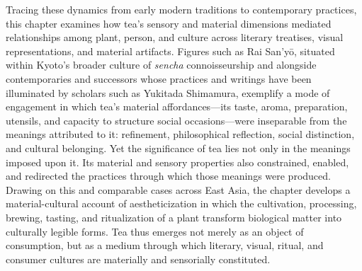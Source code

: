 \documentclass[numbers]{IntechOpen-Book}
\begin{document}
Tracing these dynamics from early modern traditions to contemporary practices, this chapter examines how tea's sensory and material dimensions mediated relationships among plant, person, and culture across literary treatises, visual representations, and material artifacts. Figures such as Rai San'yō, situated within Kyoto's broader culture of \textit{sencha} connoisseurship and alongside contemporaries and successors whose practices and writings have been illuminated by scholars such as Yukitada Shimamura, exemplify a mode of engagement in which tea's material affordances---its taste, aroma, preparation, utensils, and capacity to structure social occasions---were inseparable from the meanings attributed to it: refinement, philosophical reflection, social distinction, and cultural belonging. Yet the significance of tea lies not only in the meanings imposed upon it. Its material and sensory properties also constrained, enabled, and redirected the practices through which those meanings were produced. Drawing on this and comparable cases across East Asia, the chapter develops a material-cultural account of aestheticization in which the cultivation, processing, brewing, tasting, and ritualization of a plant transform biological matter into culturally legible forms. Tea thus emerges not merely as an object of consumption, but as a medium through which literary, visual, ritual, and consumer cultures are materially and sensorially constituted.

\end{document}
